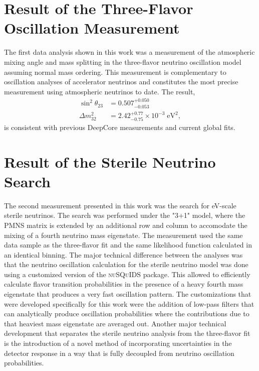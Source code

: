 \section{Result of the Three-Flavor Oscillation Measurement}
\label{sec:summary-three-flavor}

The first data analysis shown in this work was a measurement of the atmospheric mixing angle and mass splitting in the three-flavor neutrino oscillation model assuming normal mass ordering.
This measurement is complementary to oscillation analyses of accelerator neutrinos and constitutes the most precise measurement using atmospheric neutrinos to date.
The result,
\begin{align*}
    \sin^2\theta_{23} &= 0.507_{-0.053}^{+0.050}\\
    \Delta m^2_{32} &= 2.42_{-0.75}^{+0.77} \times10^{-3}\;\mathrm{eV}^2,
\end{align*}
is consistent with previous DeepCore measurements and current global fits.

\section{Result of the Sterile Neutrino Search}
\label{sec:summary-sterile-osc}

The second measurement presented in this work was the search for eV-scale sterile neutrinos.
The search was performed under the "3+1" model, where the PMNS matrix is extended by an additional row and column to accomodate the mixing of a fourth neutrino mass eigenstate.
The measurement used the same data sample as the three-flavor fit and the same likelihood function calculated in an identical binning.
The major technical difference between the analyses was that the neutrino oscillation calculation for the sterile neutrino model was done using a customized version of the \textsc{nuSQuIDS} package.
This allowed to efficiently calculate flavor transition probabilities in the presence of a heavy fourth mass eigenstate that produces a very fast oscillation pattern.
The customizations that were developed specifically for this work were the addition of low-pass filters that can analytically produce oscillation probabilities where the contributions due to that heaviest mass eigenstate are averaged out.
Another major technical development that separates the sterile neutrino analysis from the three-flavor fit is the introduction of a novel method of incorporating uncertainties in the detector response in a way that is fully decoupled from neutrino oscillation probabilities.

